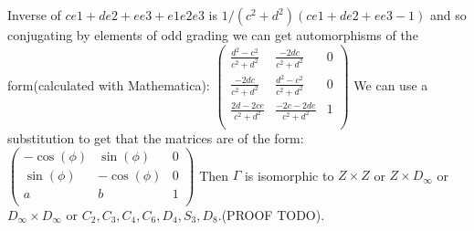 \documentclass[a4paper]{article}
\begin{document}
Inverse of $c e1+d e2+ e e3+ e1e2e3$ is $1/(c^2+d^2) (c e1 + d e2 + e e3 -1)$ and so conjugating by elements of odd grading we can get automorphisms of the form(calculated with Mathematica):
$\begin{pmatrix}
\frac{d^2-c^2}{c^2+d^2} & \frac{-2 d c}{c^2+d^2} &0 \\ 
\frac{-2 d c}{c^2+d^2} & \frac{d^2-c^2}{c^2+d^2} & 0\\
\frac{2d-2ce}{c^2+d^2} & \frac{-2c-2de}{c^2+d^2} &  1\\
\end{pmatrix}$
We can use a substitution to get that the matrices are of the form:
$\begin{pmatrix}
-\cos(\phi) & \sin(\phi) &0 \\ 
\sin(\phi) & -\cos(\phi) & 0\\
a & b &  1\\
\end{pmatrix}$
Then $\Gamma$ is isomorphic to $Z \times Z$ or $Z \times D_\infty$ or $D_\infty \times D_\infty$ or $C_2, C_3, C_4, C_6, D_4, S_3,D_8$.(PROOF TODO).
\end{document}
